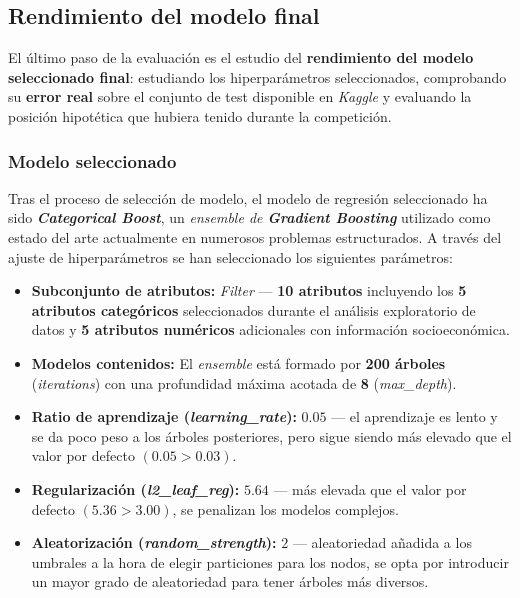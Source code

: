\subsection{Rendimiento del modelo final}

El último paso de la evaluación es el estudio del \textbf{rendimiento del modelo seleccionado final}: estudiando los hiperparámetros seleccionados, comprobando su \textbf{error real} sobre el conjunto de test disponible en \textit{Kaggle} y evaluando la posición hipotética que hubiera tenido durante la competición.

\subsubsection{Modelo seleccionado}

Tras el proceso de selección de modelo, el modelo de regresión seleccionado ha sido \textbf{\textit{Categorical Boost}}, un \textit{ensemble de \textbf{Gradient Boosting}} utilizado como estado del arte actualmente en numerosos problemas estructurados. A través del ajuste de hiperparámetros se han seleccionado los siguientes parámetros:

\begin{itemize}[parsep=1pt, itemsep=2pt, topsep=1pt]
	\item \textbf{Subconjunto de atributos:} \textit{Filter} --- \textbf{10 atributos} incluyendo los \textbf{5 atributos categóricos} seleccionados durante el análisis exploratorio de datos y \textbf{5 atributos numéricos} adicionales con información socioeconómica.
	\item \textbf{Modelos contenidos:} El \textit{ensemble} está formado por \textbf{200 árboles} (\textit{iterations}) con una profundidad máxima acotada de \textbf{8} (\textit{max\_depth}).
	\item \textbf{Ratio de aprendizaje (\textit{learning\_rate}):} $0.05$ --- el aprendizaje es lento y se da poco peso a los árboles posteriores, pero sigue siendo más elevado que el valor por defecto $(0.05 > 0.03)$.
	\item \textbf{Regularización (\textit{l2\_leaf\_reg}):} $5.64$ --- más elevada que el valor por defecto $(5.36>3.00)$, se penalizan los modelos complejos.
	\item \textbf{Aleatorización (\textit{random\_strength}):} $2$ --- aleatoriedad añadida a los umbrales a la hora de elegir particiones para los nodos, se opta por introducir un mayor grado de aleatoriedad para tener árboles más diversos.
\end{itemize}


